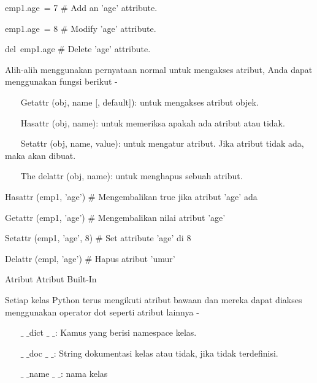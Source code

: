emp1.age~= 7   $  \#  $ Add an 'age' attribute. \par
emp1.age~= 8   $  \#  $ Modify 'age' attribute. \par
del~emp1.age   $  \#  $ Delete 'age' attribute. \par
\vspace{12pt}
Alih-alih menggunakan pernyataan normal untuk mengakses atribut, Anda dapat menggunakan fungsi berikut - \par
\vspace{12pt}
~~~ Getattr (obj, name [, default]): untuk mengakses atribut objek. \par
\vspace{12pt}
~~~ Hasattr (obj, name): untuk memeriksa apakah ada atribut atau tidak. \par
\vspace{12pt}
~~~ Setattr (obj, name, value): untuk mengatur atribut. Jika atribut tidak ada, maka akan dibuat. \par
\vspace{12pt}
~~~ The delattr (obj, name): untuk menghapus sebuah atribut. \par
\vspace{12pt}
Hasattr (emp1, 'age')  $  \#  $ Mengembalikan true jika atribut 'age' ada \par
Getattr (emp1, 'age')  $  \#  $ Mengembalikan nilai atribut 'age' \par
Setattr (emp1, 'age', 8)  $  \#  $ Set attribute 'age' di 8 \par
Delattr (empl, 'age')  $  \#  $ Hapus atribut 'umur' \par
\vspace{12pt}
Atribut Atribut Built-In \par
\vspace{12pt}
Setiap kelas Python terus mengikuti atribut bawaan dan mereka dapat diakses menggunakan operator dot seperti atribut lainnya - \par
\vspace{12pt}
~~~  $  \_  $ $  \_  $dict $  \_  $ $  \_  $: Kamus yang berisi namespace kelas. \par
\vspace{12pt}
~~~  $  \_  $ $  \_  $doc $  \_  $ $  \_  $: String dokumentasi kelas atau tidak, jika tidak terdefinisi. \par
\vspace{12pt}
~~~  $  \_  $ $  \_  $name $  \_  $ $  \_  $: nama kelas \par
\vspace{12pt}
